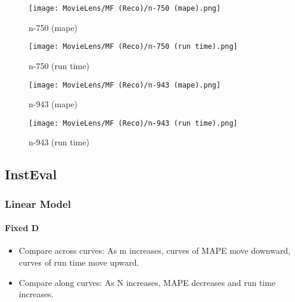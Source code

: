 \documentclass[12pt]{article}
\begin{document}
\begin{figure}[H]
\centering
    \begin{minipage}{0.45\textwidth}
        \centering
        \texttt{[image: MovieLens/MF (Reco)/n-750 (mape).png]}
        \caption{n-750 (mape)}
        
    \end{minipage}\hfill
    \begin{minipage}{0.45\textwidth}
        \centering
        \texttt{[image: MovieLens/MF (Reco)/n-750 (run time).png]}
        \caption{n-750 (run time)}
    \end{minipage}
\end{figure}

\begin{figure}[H]
\centering
    \begin{minipage}{0.45\textwidth}
        \centering
        \texttt{[image: MovieLens/MF (Reco)/n-943 (mape).png]}
        \caption{n-943 (mape)}
        
    \end{minipage}\hfill
    \begin{minipage}{0.45\textwidth}
        \centering
        \texttt{[image: MovieLens/MF (Reco)/n-943 (run time).png]}
        \caption{n-943 (run time)}
    \end{minipage}
\end{figure}


\subsection{InstEval}
\subsubsection{Linear Model}

\paragraph{Fixed D}
\begin{itemize}
\item Compare across curves: As m increases, curves of MAPE move downward, curves of run time move upward.
\item Compare along curves: As N increases, MAPE decreases and run time increases. 
\end{itemize}
\end{document}
